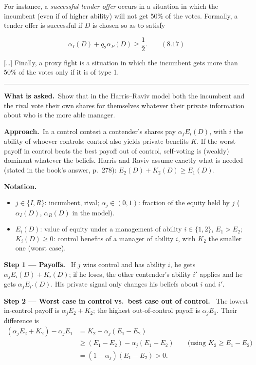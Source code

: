 \documentclass[11pt,a4paper]{article}
\newcommand{\notation}{\par\noindent\textbf{Notation.}}
\newcommand{\step}[2]{\par\medskip\noindent\textbf{Step #1 --- #2.}~}
\newcommand{\asked}{\par\medskip\noindent\textbf{What is asked.}~}
\newcommand{\approach}{\par\smallskip\noindent\textbf{Approach.}~}
\newcommand{\stmtend}{\par\endgroup\nopagebreak\noindent\rule{\linewidth}{0.4pt}\par\medskip}
\begin{document}
For instance, a \emph{successful tender offer} occurs in a situation in which the incumbent (even if
of higher ability) will not get 50\% of the votes. Formally, a tender offer is successful if \(D\)
is chosen so as to satisfy

\[\alpha_I(D) + q_2\alpha_P(D) \geq \frac{1}{2}. \qquad (8.17)\]

{[}\ldots{]} Finally, a proxy fight is a situation in which the incumbent gets more than 50\% of the
votes only if it is of type 1.
\stmtend

\asked Show that in the Harris--Raviv model both the incumbent and the rival vote their own shares for themselves whatever their private information about who is the more able manager.

\approach In a control contest a contender's shares pay $\alpha_j E_i(D)$, with $i$ the ability of whoever controls; control also yields private benefits $K$. If the worst payoff in control beats the best payoff out of control, self-voting is (weakly) dominant whatever the beliefs. Harris and Raviv assume exactly what is needed (stated in the book's answer, p.~278): $E_2(D)+K_2(D)\ge E_1(D)$.

\notation
\begin{itemize}
  \item $j\in\{I,R\}$: incumbent, rival; $\alpha_j\in(0,1)$: fraction of the equity held by $j$ ($\alpha_I(D)$, $\alpha_R(D)$ in the model).
  \item $E_i(D)$: value of equity under a management of ability $i\in\{1,2\}$, $E_1>E_2$; $K_i(D)\ge 0$: control benefits of a manager of ability $i$, with $K_2$ the smaller one (worst case).
\end{itemize}

\step{1}{Payoffs} If $j$ wins control and has ability $i$, he gets $\alpha_jE_i(D)+K_i(D)$; if he loses, the other contender's ability $i'$ applies and he gets $\alpha_jE_{i'}(D)$. His private signal only changes his beliefs about $i$ and $i'$.

\step{2}{Worst case in control vs.\ best case out of control} The lowest in-control payoff is $\alpha_jE_2+K_2$; the highest out-of-control payoff is $\alpha_jE_1$. Their difference is
\begin{align}
  (\alpha_jE_2+K_2)-\alpha_jE_1 &= K_2-\alpha_j(E_1-E_2) \label{r8e6-diff}\\
  &\ge (E_1-E_2)-\alpha_j(E_1-E_2) \qquad\text{(using } K_2\ge E_1-E_2\text{)} \nonumber\\
  &= (1-\alpha_j)(E_1-E_2) > 0. \nonumber
\end{align}
\end{document}
